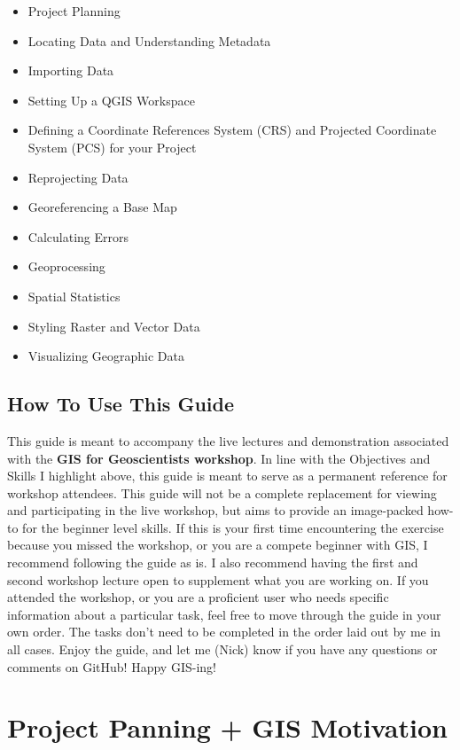 \documentclass{article}
\begin{document}
\begin{itemize}
  \item Project Planning
  \item Locating Data and Understanding Metadata
  \item Importing Data
  \item Setting Up a QGIS Workspace
  \item Defining a Coordinate References System (CRS) and Projected Coordinate System (PCS) for your Project
  \item Reprojecting Data
  \item Georeferencing a Base Map
  \item Calculating Errors
  \item Geoprocessing
  \item Spatial Statistics
  \item Styling Raster and Vector Data
  \item Visualizing Geographic Data
\end{itemize}

\subsection{How To Use This Guide}

This guide is meant to accompany the live lectures and demonstration associated with the \textbf{GIS for Geoscientists workshop}. In line with the Objectives and Skills I highlight above, this guide is meant to serve as a permanent reference for workshop attendees. This guide will not be a complete replacement for viewing and participating in the live workshop, but aims to provide an image-packed how-to for the beginner level skills. If this is your first time encountering the exercise because you missed the workshop, or you are a compete beginner with GIS, I recommend following the guide as is. I also recommend having the first and second workshop lecture open to supplement what you are working on. If you attended the workshop, or you are a proficient user who needs specific information about a particular task, feel free to move through the guide in your own order. The tasks don't need to be completed in the order laid out by me in all cases. Enjoy the guide, and let me (Nick) know if you have any questions or comments on GitHub! Happy GIS-ing!

\section{Project Panning + GIS Motivation}
\end{document}
